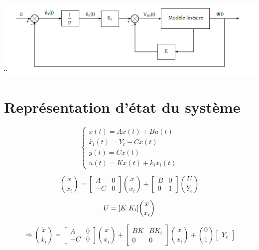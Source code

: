 \documentclass[12pt, a4paper, openany]{report}
\begin{document}
\begin{center}
\includegraphics[scale=0.6]{fig11.png} 
\label{fiig11}
\end{center}   

    \section{Représentation d'état du système} 
     
     \begin{equation*}
    \left\{\begin{matrix}
    \dot{x}(t)=Ax(t)+Bu(t)\\ 
    \dot{x_{i}}(t)=Y_{c}-Cx(t)\\
    y(t)=Cx(t)\\
    u(t)=Kx(t)+k_{i}x_{i}(t)
    \end{matrix}\right.
    \end{equation*}
    
    \begin{equation}
    \binom{\dot{x}}{\dot{x_{i}}}=\begin{bmatrix}
    A & 0\\ 
    -C & 0 
    \end{bmatrix}\binom{x}{x_{i}}+\begin{bmatrix}
    B &0 \\ 
    0 & 1
    \end{bmatrix}\binom{U}{Y_{c}}
    \end{equation}
    
    \begin{equation*}
    U=[K  \; K_{i}] \binom{x}{x_{i}}\\
\end{equation*}


\begin{equation*}
\Rightarrow\binom{\dot{x}}{\dot{x_{i}}}=\begin{bmatrix}
A & 0\\ 
-C & 0 
\end{bmatrix}\binom{x}{x_{i}}+\begin{bmatrix}
BK & BK_{i}\\ 
 0& 0
\end{bmatrix}\binom{x}{x_{i}}+ \binom{0}{1}\begin{bmatrix}
Y_{c}
\end{bmatrix}
\end{equation*}
\end{document}
